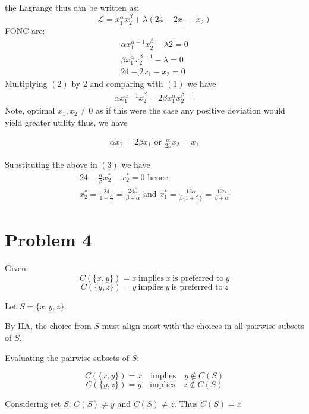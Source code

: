 \documentclass{article}
\begin{document}
the Lagrange thus can be written as:
\[
\mathcal{L}= x_1^\alpha x_2^\beta+\lambda(24-2x_1-x_2)
\]
FONC are:
\begin{gather}
    \alpha x_1^{\alpha-1}x_2^\beta-\lambda2=0 \\
    \beta x_1^\alpha x_2^{\beta-1}-\lambda=0 \\
    24-2x_1-x_2=0
\end{gather}
Multiplying $(2)$ by 2 and comparing with $(1)$ we have 
\begin{gather*}
    \alpha x_1^{\alpha-1}x_2^\beta=2\beta x_1^\alpha x_2^{\beta-1}
\end{gather*}
Note, optimal $x_1,x_2 \neq 0$ as if this were the case any positive deviation would yield greater utility thus, we have

\begin{gather*}
  \alpha x_2=2 \beta x_1 \text{ or } \frac{\alpha}{2\beta}x_2=x_1 
\end{gather*}

Substituting the above in $(3)$ we have 
\begin{gather*}
    24-\frac{\alpha}{\beta}x_2^*-x_2^*=0 \text{ hence, }\\
    x_2^*=\frac{24}{1+\frac{\alpha}{\beta}}=\frac{24\beta}{\beta+\alpha} \text{ and } x_1^*=\frac{12 \alpha}{\beta \{1+\frac{\alpha}{\beta}\}}=\frac{12\alpha}{\beta+\alpha}
\end{gather*}





\section*{Problem 4} %

Given:
\[
C(\{x, y\}) = x\ \text{implies} \ x \ \text{is preferred to} \ y
\]
\[
C(\{y, z\}) = y\ \text{implies} \ y \ \text{is preferred to} \ z
\]

Let \( S = \{x, y, z\} \). 

By IIA,  
the choice from \( S \) must align most with the choices in all pairwise subsets of \( S \).

Evaluating the pairwise subsets of \( S \):

\[
C(\{x, y\}) = x \quad \text{implies} \quad y \notin C(S)
\]
\[
C(\{y, z\}) = y \quad \text{implies} \quad z \notin C(S)
\]


Considering set \( S \), \quad \( C(S) \neq y \) and \( C(S) \neq z \). \quad 
Thus \( C(S) = x \)
\end{document}

